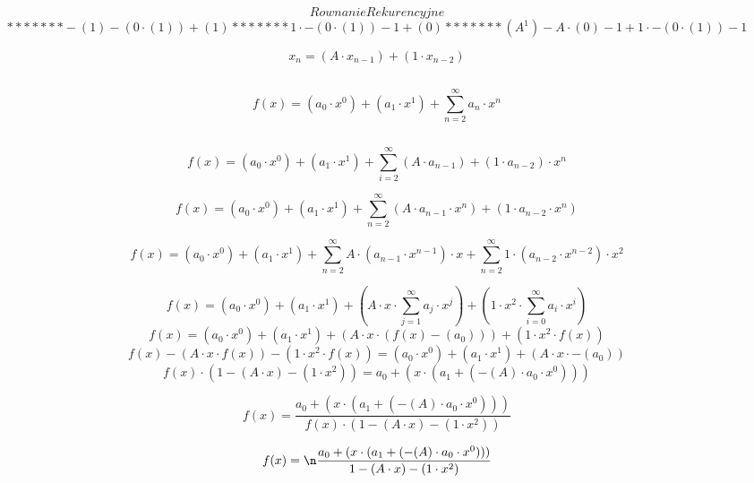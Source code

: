 \documentclass[12pt]{article}
\begin{document}
 
 
 $$  Rownanie  Rekurencyjne  $$ $$ *******-(1)-(0\cdot(1))+(1)*******1\cdot-(0\cdot(1))-1+(0)*******({A}^{1})-{A}\cdot(0)-1+1\cdot-(0\cdot(1))-1$$ 
  
 
  $$   {{x}}_{{n}} = ({A}\cdot{{x}}_{{n-1}})+(1\cdot{{x}}_{{n-2}})$$ 
  
 
  $$ $$ 
 
 
 $$f(x) = ({{a}}_{0}\cdot{x}^{0})+({{a}}_{1}\cdot{x}^{1})+\sum_{{n} = {2}}^{{\infty}}{{a}}_{{n}}\cdot{x}^{n}$$ 
  
 
  $$    $$ 
  
 
  $$   f(x) = ({{a}}_{0}\cdot{x}^{0})+({{a}}_{1}\cdot{x}^{1})+\sum_{{i} = {2}}^{{\infty}}({A}\cdot{{a}}_{{n-1}})+(1\cdot{{a}}_{{n-2}})\cdot{x}^{n}$$ 
 
 
 $$ f(x) = ({{a}}_{0}\cdot{x}^{0})+({{a}}_{1}\cdot{x}^{1})+\sum_{{n} = {2}}^{{\infty}}({A}\cdot{{a}}_{{n-1}}\cdot{x}^{n})+(1\cdot{{a}}_{{n-2}}\cdot{x}^{n})$$ 
  
 
  $$    f(x) = ({{a}}_{0}\cdot{x}^{0})+({{a}}_{1}\cdot{x}^{1})+\sum_{{n} = {2}}^{{\infty}}{A}\cdot({{a}}_{{n-1}}\cdot{x}^{n-1})\cdot{x}+\sum_{{n} = {2}}^{{\infty}}1\cdot({{a}}_{{n-2}}\cdot{x}^{n-2})\cdot{x}^{2} $$
 
 
 $$		f(x) = ({{a}}_{0}\cdot{x}^{0})+({{a}}_{1}\cdot{x}^{1})+({A}\cdot{x}\cdot\sum_{{j} = {1}}^{{\infty}}{{a}}_{{j}}\cdot{x}^{j})+(1\cdot{x}^{2}\cdot\sum_{{i} = {0}}^{{\infty}}{{a}}_{{i}}\cdot{x}^{i }) $$
  $$		$$ 
 $$  f(x) = ({{a}}_{0}\cdot{x}^{0})+({{a}}_{1}\cdot{x}^{1})+({A}\cdot{x}\cdot({f(x)}-({{a}}_{{0}})))+(1\cdot{x}^{2}\cdot{f(x)})$$ 
   $$  $$ 
   $$  {f(x)}-({A}\cdot{x}\cdot{f(x)})-(1\cdot{x}^{2}\cdot{f(x)})  =  ({{a}}_{0}\cdot{x}^{0})+({{a}}_{1}\cdot{x}^{1})+({A}\cdot{x}\cdot-({{a}}_{{0}}))$$ 
 $$  $$ 
 $$  {f(x)}\cdot({1}-({A}\cdot{x})-(1\cdot{x}^{2})) = {{a}}_{{0}}+({x}\cdot({{a}}_{{1}}+(-({A})\cdot{{a}}_{{0}}\cdot{x}^{0})))$$ 
  
 
  $$ f(x) =    \frac{{{a}}_{{0}}+({x}\cdot({{a}}_{{1}}+(-({A})\cdot{{a}}_{{0}}\cdot{x}^{0})))}{{f(x)}\cdot({1}-({A}\cdot{x})-(1\cdot{x}^{2}))}$$
  
 
 
    $$  f(x) =  \n\frac{{{a}}_{{0}}+({x}\cdot({{a}}_{{1}}+(-({A})\cdot{{a}}_{{0}}\cdot{x}^{0})))}{{1}-({A}\cdot{x})-(1\cdot{x}^{2})}  $$ 
 
\end{document}
